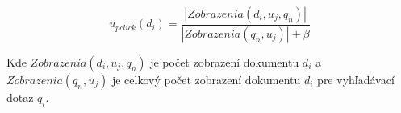 \begin{equation} \label{eq:pclick}
u_{pclick}(d_i) = \frac{|Zobrazenia(d_i, u_j, q_n)|}{|Zobrazenia(q_n, u_j)| + \beta}
\end{equation}

Kde \(Zobrazenia(d_i, u_j, q_n)\) je počet zobrazení dokumentu \(d_i\) a 
\(Zobrazenia(q_n, u_j)\) je celkový počet zobrazení dokumentu \(d_i\)
pre vyhľadávací dotaz \(q_i\).

